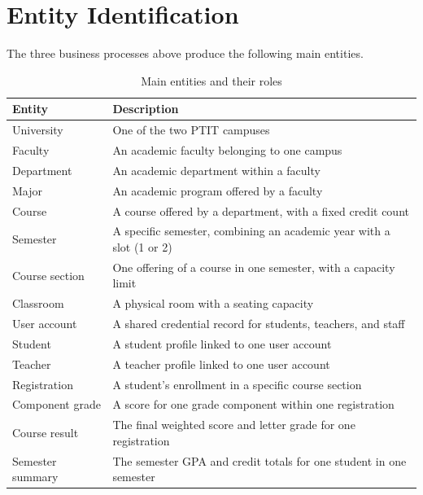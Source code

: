 \documentclass[12pt,a4paper]{report}
\begin{document}
\section{Entity Identification}

The three business processes above produce the following main entities.

\begin{table}[H]
\renewcommand{\arraystretch}{1.35}
\caption{Main entities and their roles}
\label{tab:entities}
\begin{tabular}{|p{4cm}|p{9.7cm}|}
  \hline
  \textbf{Entity} & \textbf{Description} \\
  \hline
  University & One of the two PTIT campuses \\
  \hline
  Faculty & An academic faculty belonging to one campus \\
  \hline
  Department & An academic department within a faculty \\
  \hline
  Major & An academic program offered by a faculty \\
  \hline
  Course & A course offered by a department, with a fixed credit count \\
  \hline
  Semester & A specific semester, combining an academic year with a slot (1 or 2) \\
  \hline
  Course section & One offering of a course in one semester, with a capacity limit \\
  \hline
  Classroom & A physical room with a seating capacity \\
  \hline
  User account & A shared credential record for students, teachers, and staff \\
  \hline
  Student & A student profile linked to one user account \\
  \hline
  Teacher & A teacher profile linked to one user account \\
  \hline
  Registration & A student's enrollment in a specific course section \\
  \hline
  Component grade & A score for one grade component within one registration \\
  \hline
  Course result & The final weighted score and letter grade for one registration \\
  \hline
  Semester summary & The semester GPA and credit totals for one student in one semester \\
  \hline
\end{tabular}
\end{table}
\end{document}
